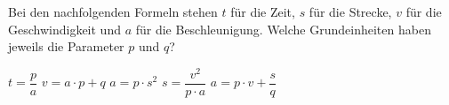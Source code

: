 Bei den nachfolgenden Formeln stehen $t$ für die Zeit, $s$ für die Strecke, $v$ für die Geschwindigkeit und $a$ für die Beschleunigung. Welche Grundeinheiten haben jeweils die Parameter $p$ und $q$?

\begin{abcliste}
\abc $t = \dfrac{p}{a}$
\abc $v = a\cdot p + q$
\abc $a = p\cdot s^2$
\abc $s = \dfrac{v^2}{p\cdot a}$
\abc $a = p\cdot v + \dfrac{s}{q}$
\end{abcliste}
